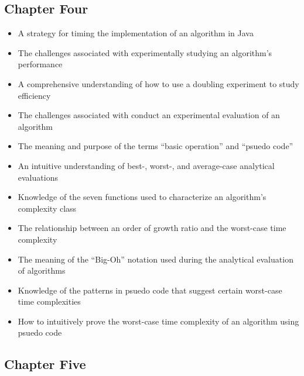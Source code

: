 \documentclass[11pt]{article}
\begin{document}
\vspace*{-.2in}
\subsection*{Chapter Four}

\begin{itemize}

  \item A strategy for timing the implementation of an algorithm in Java

  \item The challenges associated with experimentally studying an algorithm's
    performance

  \item A comprehensive understanding of how to use a doubling experiment to
    study efficiency

  \item The challenges associated with conduct an experimental evaluation of an
    algorithm

  \item The meaning and purpose of the terms ``basic operation'' and ``psuedo code''

  \item An intuitive understanding of best-, worst-, and average-case analytical
    evaluations

  \item Knowledge of the seven functions used to characterize an algorithm's
    complexity class

  \item The relationship between an order of growth ratio and the worst-case
    time complexity

  \item The meaning of the ``Big-Oh'' notation used during the
    analytical evaluation of algorithms

  \item Knowledge of the patterns in psuedo code that suggest certain
    worst-case time complexities

  \item How to intuitively prove the worst-case time complexity of an algorithm
    using psuedo code

\end{itemize}

\vspace*{-.2in}
\subsection*{Chapter Five}
\end{document}
